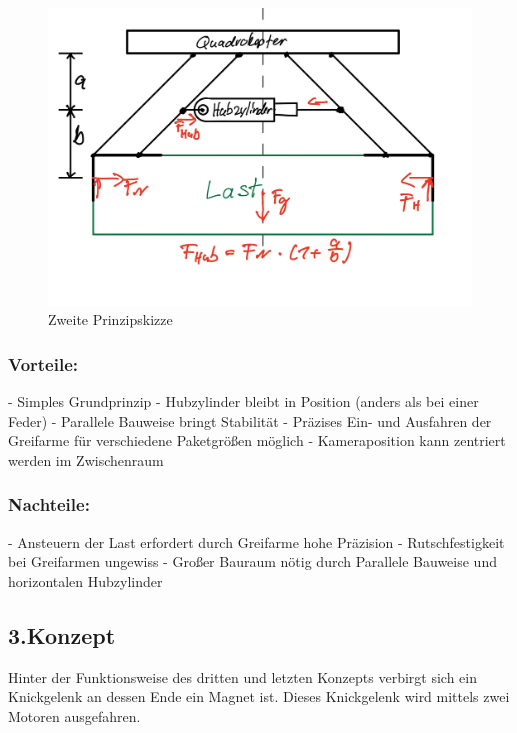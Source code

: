 \begin{figure}
\begin{center}
\includegraphics[scale=0.5]{Grafiken/Skizze2mechanik.jpg}
\caption{Zweite Prinzipskizze}
\label{zweite_prinzipskizze}
\end{center}
\end{figure}

\subsubsection{Vorteile:}
-	Simples Grundprinzip
-	Hubzylinder bleibt in Position (anders als bei einer Feder)
-	Parallele Bauweise bringt Stabilität
-	Präzises Ein- und Ausfahren der Greifarme für verschiedene Paketgrößen möglich 
-	Kameraposition kann zentriert werden im Zwischenraum

\subsubsection{Nachteile:}
-	Ansteuern der Last erfordert durch Greifarme hohe Präzision
-	Rutschfestigkeit bei Greifarmen ungewiss
-	Großer Bauraum nötig durch Parallele Bauweise und horizontalen Hubzylinder

\subsection{3.Konzept}
Hinter der Funktionsweise des dritten und letzten Konzepts verbirgt sich ein Knickgelenk an dessen Ende ein Magnet ist. Dieses Knickgelenk wird mittels zwei Motoren ausgefahren.

